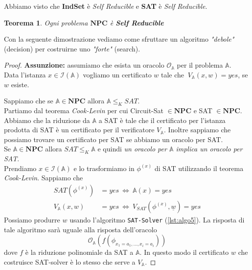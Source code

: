 \documentclass[a4paper]{article}
\newtheorem{thm}{Teorema}[subsection]
\theoremstyle{definition}
\newcommand{\npc}{\mathbf{NPC}}
\newcommand{\prob}[1]{\mathbb{#1}}
\newcommand{\instance}[1]{\mathcal{I}(\prob{#1})}
\begin{document}
		Abbiamo visto che \textbf{IndSet} è \textit{Self Reducible} e \textbf{SAT} è \textit{Self Reducible}.
		
		\begin{thm}
			Ogni problema $ \npc $ è \textbf{Self Reducible}
		\end{thm}
		
		Con la seguente dimostrazione vediamo come sfruttare un algoritmo \textit{"debole"} (decision) per costruirne uno \textit{"forte"} (search).
		
		\begin{proof}
			\textbf{Assunzione:} assumiamo che esista un oracolo $ \mathcal{O}_{\prob{A}} $ per il problema $ \prob{A} $.\\
			Data l'istanza $ x \in \instance{A} $ vogliamo un certificato $ w $ tale che $ \ V_{\prob{A}}(x, w) = yes $, se $ w $ esiste.
			
			Sappiamo che se $ \prob{A}\in \npc $ allora $ \prob{A}\leq_K SAT $.\\
			
			Partiamo dal teorema \textit{Cook-Levin} per cui Circuit-Sat $ \in \npc $ e SAT $ \in \npc $. Abbiamo che la riduzione da $ \prob{A} $ a SAT è tale che il certificato per l'istanza prodotta di SAT è un certificato per il verificatore $ V_{\prob{A}} $. 
			Inoltre sappiamo che possiamo trovare un certificato per SAT se abbiamo un oracolo per SAT.\\
			
			Se $ \prob{A}\in\npc $ allora $ SAT\leq_K\prob{A} $ e quindi \textit{un oracolo per $ \prob{A} $ implica un oracolo per SAT}.\\
			
			Prendiamo $ x\in\instance{A} $ e lo trasformiamo in $ \phi^{(x)} $ di SAT utilizzando il teorema \textit{Cook-Levin}. Sappiamo che
			\begin{align*}
				SAT(\phi^{(x)}) &= yes \ \Leftrightarrow\ \prob{A}(x) = yes \\
				V_{\prob{A}}(x, w) &= yes\ \Leftrightarrow\ V_{SAT}(\phi^{(x)}, \underline{w} ) = yes
			\end{align*}
			Possiamo produrre $ w $ usando l'algoritmo \lstinline|SAT-Solver| (\ref{lst:algo5}). La risposta di tale algoritmo sarà uguale alla risposta dell'oracolo
			\[
				\mathcal{O}_{\prob{A}}(f(\phi_{x_1 = a_1, \dots, x_i = a_i}))
			\]
			dove $ f $ è la riduzione polinomiale da SAT a $ \prob{A} $. In questo modo il certificato $ w $ che costruisce SAT-solver è lo stesso che serve a $ V_{\prob{A}} $.
		\end{proof}
		
\end{document}
